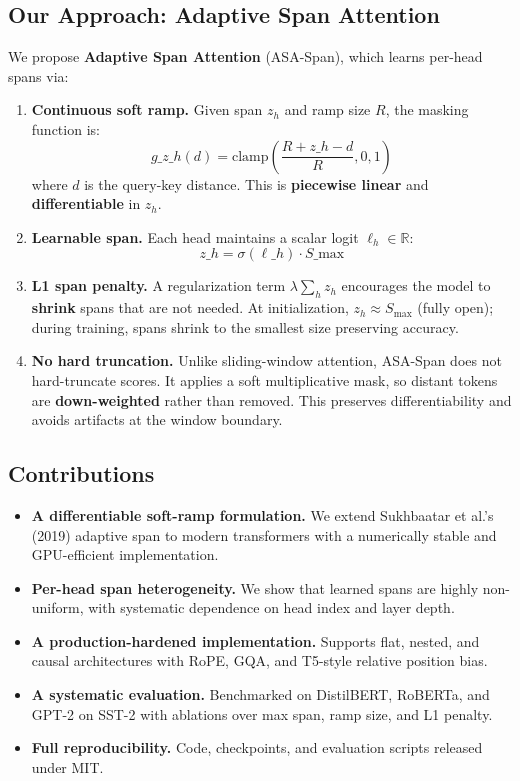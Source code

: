 \subsection{Our Approach: Adaptive Span Attention}

We propose \textbf{Adaptive Span Attention} (ASA-Span), which learns per-head 
spans via:

\begin{enumerate}
\item \textbf{Continuous soft ramp.} Given span $z_h$ and ramp size $R$, the masking
  function is:
  \[
g\_{z\_h}(d) = \text{clamp}\!\left(\frac{R + z\_h - d}{R}, 0, 1\right)
\]
  where $d$ is the query-key distance. This is \textbf{piecewise linear} and
  \textbf{differentiable} in $z_h$.

\item \textbf{Learnable span.} Each head maintains a scalar logit $\ell_h \in \mathbb{R}$:
  \[
z\_h = \sigma(\ell\_h) \cdot S\_\text{max}
\]

\item \textbf{L1 span penalty.} A regularization term $\lambda \sum_h z_h$ encourages
  the model to \textbf{shrink} spans that are not needed. At initialization,
  $z_h \approx S_\text{max}$ (fully open); during training, spans shrink
  to the smallest size preserving accuracy.

\item \textbf{No hard truncation.} Unlike sliding-window attention, ASA-Span does not
  hard-truncate scores. It applies a soft multiplicative mask, so distant
  tokens are \textbf{down-weighted} rather than removed. This preserves
  differentiability and avoids artifacts at the window boundary.

\end{enumerate}
\subsection{Contributions}

\begin{itemize}
\item \textbf{A differentiable soft-ramp formulation.} We extend Sukhbaatar et al.'s
  (2019) adaptive span to modern transformers with a numerically stable and
  GPU-efficient implementation.
\item \textbf{Per-head span heterogeneity.} We show that learned spans are highly
  non-uniform, with systematic dependence on head index and layer depth.
\item \textbf{A production-hardened implementation.} Supports flat, nested, and causal
  architectures with RoPE, GQA, and T5-style relative position bias.
\item \textbf{A systematic evaluation.} Benchmarked on DistilBERT, RoBERTa, and GPT-2
  on SST-2 with ablations over max span, ramp size, and L1 penalty.
\item \textbf{Full reproducibility.} Code, checkpoints, and evaluation scripts released
  under MIT.

\end{itemize}
